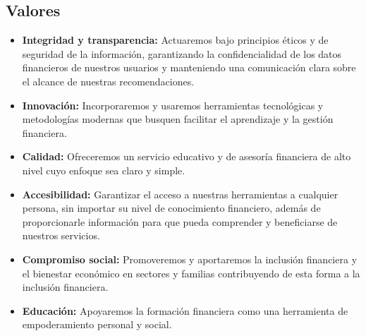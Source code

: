 \subsection*{Valores}

\begin{itemize}
	\item \textbf{Integridad y transparencia:} Actuaremos bajo principios éticos y de seguridad de la información, garantizando la confidencialidad de los datos financieros de nuestros usuarios y manteniendo una comunicación clara sobre el alcance de nuestras recomendaciones.
	
	\item \textbf{Innovación:} Incorporaremos y usaremos herramientas tecnológicas y metodologías modernas que busquen facilitar el aprendizaje y la gestión financiera. 
	
	\item \textbf{Calidad:} Ofreceremos un servicio educativo y de asesoría financiera de alto nivel cuyo enfoque sea claro y simple.
	
	\item \textbf{Accesibilidad:} Garantizar el acceso a nuestras herramientas a cualquier persona, sin importar su nivel de conocimiento financiero, además de proporcionarle información para que pueda comprender y beneficiarse de nuestros servicios.
	
	\item \textbf{Compromiso social:} Promoveremos y aportaremos la inclusión financiera y el bienestar económico en sectores y familias contribuyendo de esta forma a la inclusión financiera.
	
	\item \textbf{Educación:} Apoyaremos la formación financiera como una herramienta de empoderamiento personal y social.
\end{itemize}
